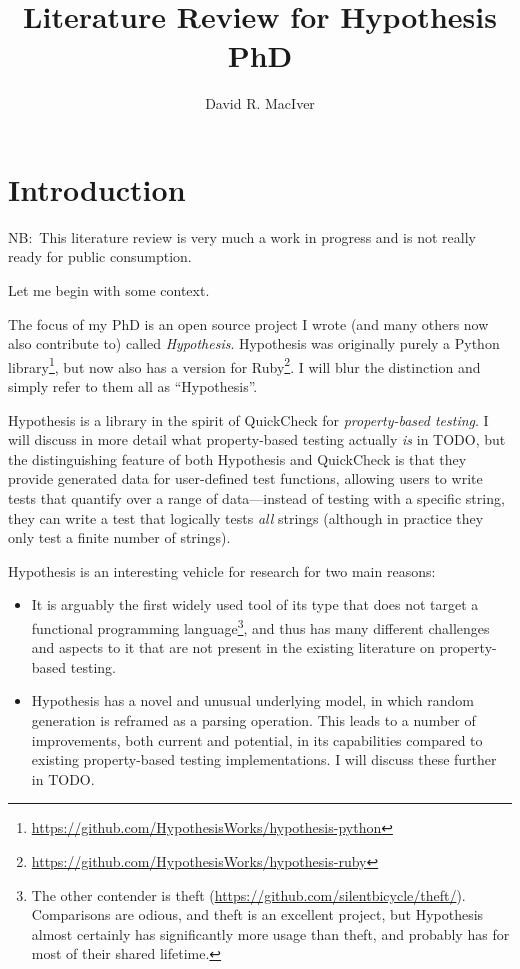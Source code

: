 

\title{Literature Review for Hypothesis PhD}
\author{David R. MacIver}



\maketitle

\tableofcontents

\chapter{Introduction}

NB:\ This literature review is very much a work in progress and is not really ready for public consumption.

Let me begin with some context.

The focus of my PhD is an open source project I wrote (and many others now also contribute to) called \emph{Hypothesis}.
Hypothesis was originally purely a Python library\footnote{\url{https://github.com/HypothesisWorks/hypothesis-python}},
but now also has a version for Ruby\footnote{\url{https://github.com/HypothesisWorks/hypothesis-ruby}}.
I will blur the distinction and simply refer to them all as ``Hypothesis''.

Hypothesis is a library in the spirit of QuickCheck\cite{DBLP:conf/icfp/ClaessenH00} for \emph{property-based testing}.
I will discuss in more detail what property-based testing actually \emph{is} in TODO,
but the distinguishing feature of both Hypothesis and QuickCheck is that they provide generated data for user-defined test functions,
allowing users to write tests that quantify over a range of data---instead
of testing with a specific string,
they can write a test that logically tests \emph{all} strings (although in practice they only test a finite number of strings).

Hypothesis is an interesting vehicle for research for two main reasons:

\begin{itemize}
\item It is arguably the first widely used tool of its type that does not target a functional programming language\footnote{
The other contender is theft (\url{https://github.com/silentbicycle/theft/}).
Comparisons are odious,
and theft is an excellent project,
but Hypothesis almost certainly has significantly more usage than theft,
and probably has for most of their shared lifetime.
},
and thus has many different challenges and aspects to it that are not present in the existing literature on property-based testing.
\item Hypothesis has a novel and unusual underlying model,
in which random generation is reframed as a parsing operation.
This leads to a number of improvements,
both current and potential,
in its capabilities compared to existing property-based testing implementations.
I will discuss these further in TODO.\ 
\end{itemize}

